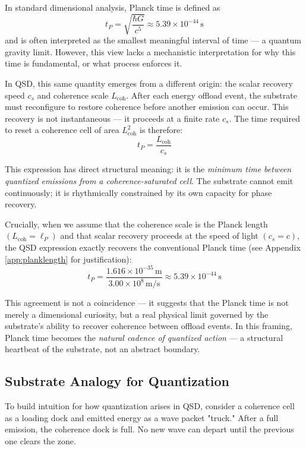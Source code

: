 \documentclass[ht-mathphys]{ht-fmt}
\theoremstyle{thmstyleone}%
\theoremstyle{thmstyletwo}%
\theoremstyle{thmstylethree}%
\begin{document}
In standard dimensional analysis, Planck time is defined as
\[
t_P = \sqrt{\frac{\hbar G}{c^5}} \approx 5.39 \times 10^{-44} \, \text{s}
\]
and is often interpreted as the smallest meaningful interval of time — a quantum gravity limit. However, this view lacks a mechanistic interpretation for why this time is fundamental, or what process enforces it.

In QSD, this same quantity emerges from a different origin: the scalar recovery speed $c_s$ and coherence scale $L_{\text{coh}}$. After each energy offload event, the substrate must reconfigure to restore coherence before another emission can occur. This recovery is not instantaneous — it proceeds at a finite rate $c_s$. The time required to reset a coherence cell of area $L_{\text{coh}}^2$ is therefore:
\[
t_P = \frac{L_{\text{coh}}}{c_s}
\]

This expression has direct structural meaning: it is the \textit{minimum time between quantized emissions from a coherence-saturated cell}. The substrate cannot emit continuously; it is rhythmically constrained by its own capacity for phase recovery.

Crucially, when we assume that the coherence scale is the Planck length \( (L_{\text{coh}} = \ell_P) \) and that scalar recovery proceeds at the speed of light \( (c_s = c) \), the QSD expression exactly recovers the conventional Planck time (see Appendix \ref{app:planklength} for justification):
\[
t_P = \frac{1.616 \times 10^{-35} \, \text{m}}{3.00 \times 10^8 \, \text{m/s}} \approx 5.39 \times 10^{-44} \, \text{s}
\]

This agreement is not a coincidence — it suggests that the Planck time is not merely a dimensional curiosity, but a real physical limit governed by the substrate’s ability to recover coherence between offload events. In this framing, Planck time becomes the \textit{natural cadence of quantized action} — a structural heartbeat of the substrate, not an abstract boundary.

\subsection{Substrate Analogy for Quantization}

To build intuition for how quantization arises in QSD, consider a coherence cell as a loading dock and emitted energy as a wave packet "truck." After a full emission, the coherence dock is full. No new wave can depart until the previous one clears the zone. 
\end{document}
